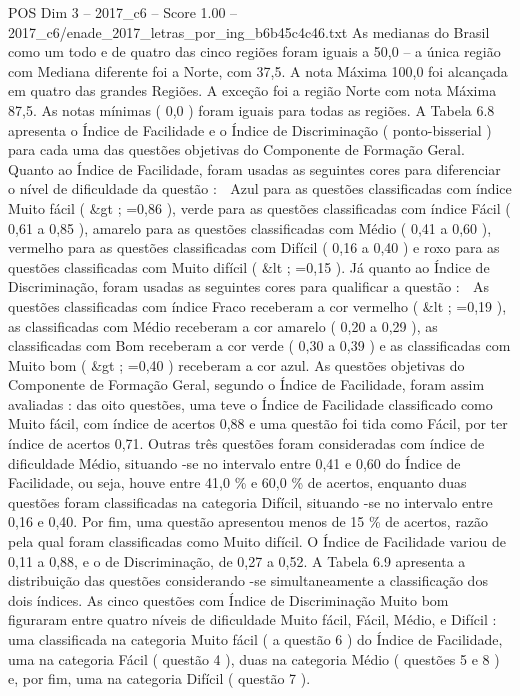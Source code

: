 \begin{textsample}{POS Dim 3 – 2017\_c6 – Score 1.00 – 2017\_c6/enade\_2017\_letras\_por\_ing\_b6b45c4c46.txt}
As medianas do Brasil como um todo e de quatro das cinco regiões foram iguais a 50,0 – a única região com Mediana diferente foi a Norte, com 37,5.
A nota Máxima 100,0 foi alcançada em quatro das grandes Regiões.
A exceção foi a região Norte com nota Máxima 87,5.
As notas mínimas ( 0,0 ) foram iguais para todas as regiões.
A Tabela 6.8 apresenta o Índice de Facilidade e o Índice de Discriminação ( ponto-bisserial ) para cada uma das questões objetivas do Componente de Formação Geral.
Quanto ao Índice de Facilidade, foram usadas as seguintes cores para diferenciar o nível de dificuldade da questão :  Azul para as questões classificadas com índice Muito fácil ( \&gt ; =0,86 ), verde para as questões classificadas com índice Fácil ( 0,61 a 0,85 ), amarelo para as questões classificadas com Médio ( 0,41 a 0,60 ), vermelho para as questões classificadas com Difícil ( 0,16 a 0,40 ) e roxo para as questões classificadas com Muito difícil ( \&lt ; =0,15 ).
Já quanto ao Índice de Discriminação, foram usadas as seguintes cores para qualificar a questão :  As questões classificadas com índice Fraco receberam a cor vermelho ( \&lt ; =0,19 ), as classificadas com Médio receberam a cor amarelo ( 0,20 a 0,29 ), as classificadas com Bom receberam a cor verde ( 0,30 a 0,39 ) e as classificadas com Muito bom ( \&gt ; =0,40 ) receberam a cor azul.
As questões objetivas do Componente de Formação Geral, segundo o Índice de Facilidade, foram assim avaliadas : das oito questões, uma teve o Índice de Facilidade classificado como Muito fácil, com índice de acertos 0,88 e uma questão foi tida como Fácil, por ter índice de acertos 0,71.
Outras três questões foram consideradas com índice de dificuldade Médio, situando -se no intervalo entre 0,41 e 0,60 do Índice de Facilidade, ou seja, houve entre 41,0 \% e 60,0 \% de acertos, enquanto duas questões foram classificadas na categoria Difícil, situando -se no intervalo entre 0,16 e 0,40.
Por fim, uma questão apresentou menos de 15 \% de acertos, razão pela qual foram classificadas como Muito difícil.
O Índice de Facilidade variou de 0,11 a 0,88, e o de Discriminação, de 0,27 a 0,52.
A Tabela 6.9 apresenta a distribuição das questões considerando -se simultaneamente a classificação dos dois índices.
As cinco questões com Índice de Discriminação Muito bom figuraram entre quatro níveis de dificuldade Muito fácil, Fácil, Médio, e Difícil : uma classificada na categoria Muito fácil ( a questão 6 ) do Índice de Facilidade, uma na categoria Fácil ( questão 4 ), duas na categoria Médio ( questões 5 e 8 ) e, por fim, uma na categoria Difícil ( questão 7 ).

\end{textsample}
